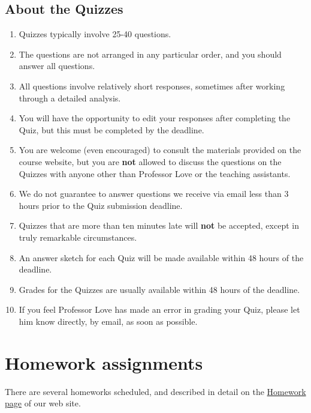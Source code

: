 \documentclass[
]{book}
\providecommand{\tightlist}{%
  \setlength{\itemsep}{0pt}\setlength{\parskip}{0pt}}
\begin{document}
\hypertarget{about-the-quizzes}{%
\subsection{About the Quizzes}\label{about-the-quizzes}}

\begin{enumerate}
\def\labelenumi{\arabic{enumi}.}
\tightlist
\item
  Quizzes typically involve 25-40 questions.
\item
  The questions are not arranged in any particular order, and you should answer all questions.
\item
  All questions involve relatively short responses, sometimes after working through a detailed analysis.
\item
  You will have the opportunity to edit your responses after completing the Quiz, but this must be completed by the deadline.
\item
  You are welcome (even encouraged) to consult the materials provided on the course website, but you are \textbf{not} allowed to discuss the questions on the Quizzes with anyone other than Professor Love or the teaching assistants.
\item
  We do not guarantee to answer questions we receive via email less than 3 hours prior to the Quiz submission deadline.
\item
  Quizzes that are more than ten minutes late will \textbf{not} be accepted, except in truly remarkable circumstances.
\item
  An answer sketch for each Quiz will be made available within 48 hours of the deadline.
\item
  Grades for the Quizzes are usually available within 48 hours of the deadline.
\item
  If you feel Professor Love has made an error in grading your Quiz, please let him know directly, by email, as soon as possible.
\end{enumerate}

\hypertarget{homework-assignments}{%
\section{Homework assignments}\label{homework-assignments}}

There are several homeworks scheduled, and described in detail on the \href{https://github.com/THOMASELOVE/2019-431/tree/master/HOMEWORK}{Homework page} of our web site.
\end{document}
